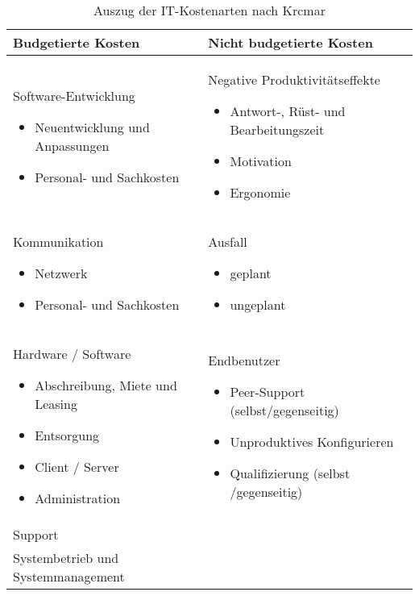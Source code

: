\begin{table}[h!]
	\begin{tabularx}{\textwidth}{|X|X|}
		\hline \textbf{Budgetierte Kosten}  &  \textbf{Nicht budgetierte Kosten}\\
		\hline Software-Entwicklung 
			\begin{itemize}
				\item Neuentwicklung und Anpassungen
				\item Personal- und Sachkosten	
			\end{itemize}  
		& Negative Produktivitätseffekte
			\begin{itemize}
				\item Antwort-, Rüst- und Bearbeitungszeit
				\item Motivation
				\item Ergonomie
			\end{itemize} \\ 
		\hline Kommunikation \begin{itemize}
			\item Netzwerk
			\item Personal- und Sachkosten			
		\end{itemize} & Ausfall \begin{itemize}
			\item geplant
			\item ungeplant
		\end{itemize} \\ 
		\hline Hardware / Software \begin{itemize}
			\item Abschreibung, Miete und Leasing
			\item Entsorgung
			\item Client / Server
			\item Administration	
		\end{itemize} & Endbenutzer \begin{itemize}
			\item Peer-Support (selbst/gegenseitig)
			\item Unproduktives Konfigurieren
			\item Qualifizierung (selbst /gegenseitig)
		\end{itemize}  \\
		\hline Support &   \\
		\hline Systembetrieb und Systemmanagement & \\
		\hline
	\end{tabularx}
	\caption{Auszug der IT-Kostenarten nach Krcmar}
	\label{tab_auswahl_IT_kostenarten}
\end{table}

